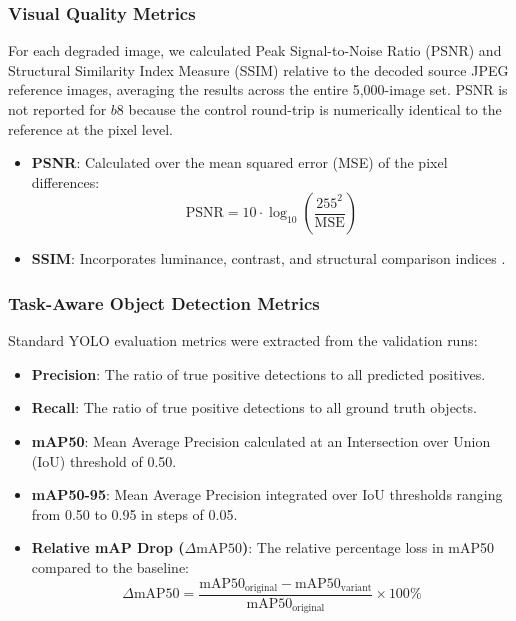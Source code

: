\documentclass[12pt, a4paper]{article}
\begin{document}
\subsubsection{Visual Quality Metrics}
For each degraded image, we calculated Peak Signal-to-Noise Ratio (PSNR) and Structural Similarity Index Measure (SSIM) relative to the decoded source JPEG reference images, averaging the results across the entire 5,000-image set. PSNR is not reported for $b8$ because the control round-trip is numerically identical to the reference at the pixel level.
\begin{itemize}
    \item \textbf{PSNR}: Calculated over the mean squared error (MSE) of the pixel differences:
    \begin{equation}
    \text{PSNR} = 10 \cdot \log_{10}\left(\frac{255^2}{\text{MSE}}\right)
    \label{eq:psnr}
    \end{equation}
    \item \textbf{SSIM}: Incorporates luminance, contrast, and structural comparison indices \cite{wang2004}.
\end{itemize}

\subsubsection{Task-Aware Object Detection Metrics}
Standard YOLO evaluation metrics were extracted from the validation runs:
\begin{itemize}
    \item \textbf{Precision}: The ratio of true positive detections to all predicted positives.
    \item \textbf{Recall}: The ratio of true positive detections to all ground truth objects.
    \item \textbf{mAP50}: Mean Average Precision calculated at an Intersection over Union (IoU) threshold of 0.50.
    \item \textbf{mAP50-95}: Mean Average Precision integrated over IoU thresholds ranging from 0.50 to 0.95 in steps of 0.05.
    \item \textbf{Relative mAP Drop ($\Delta \text{mAP50}$)}: The relative percentage loss in mAP50 compared to the baseline:
    \begin{equation}
    \Delta \text{mAP50} = \frac{\text{mAP50}_{\text{original}} - \text{mAP50}_{\text{variant}}}{\text{mAP50}_{\text{original}}} \times 100\%
    \label{eq:map_drop}
    \end{equation}
\end{itemize}
\end{document}

